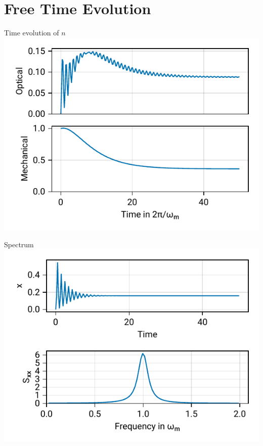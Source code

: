 \documentclass{beamer}
\begin{document}
\section{Free Time Evolution}
\begin{frame}{Time evolution of $n$}
	\centering
	\includegraphics{figures/01 cooling.pdf}
\end{frame}

\begin{frame}{Spectrum}
	\centering
	\includegraphics{figures/02 spectrum.pdf}
\end{frame}
\end{document}
